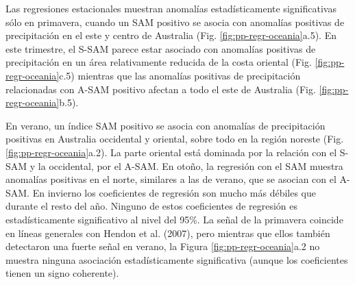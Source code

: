 \documentclass[12pt,oneside]{reedthesis}
\begin{document}
Las regresiones estacionales muestran anomalías estadísticamente significativas sólo en primavera, cuando un SAM positivo se asocia con anomalías positivas de precipitación en el este y centro de Australia (Fig. \ref{fig:pp-regr-oceania}a.5).
En este trimestre, el S-SAM parece estar asociado con anomalías positivas de precipitación en un área relativamente reducida de la costa oriental (Fig. \ref{fig:pp-regr-oceania}c.5) mientras que las anomalías positivas de precipitación relacionadas con A-SAM positivo afectan a todo el este de Australia (Fig. \ref{fig:pp-regr-oceania}b.5).

En verano, un índice SAM positivo se asocia con anomalías de precipitación positivas en Australia occidental y oriental, sobre todo en la región noreste (Fig. \ref{fig:pp-regr-oceania}a.2).
La parte oriental está dominada por la relación con el S-SAM y la occidental, por el A-SAM.
En otoño, la regresión con el SAM muestra anomalías positivas en el norte, similares a las de verano, que se asocian con el A-SAM.
En invierno los coeficientes de regresión son mucho más débiles que durante el resto del año.
Ninguno de estos coeficientes de regresión es estadísticamente significativo al nivel del 95\%.
La señal de la primavera coincide en líneas generales con Hendon et al. (2007), pero mientras que ellos también detectaron una fuerte señal en verano, la Figura \ref{fig:pp-regr-oceania}a.2 no muestra ninguna asociación estadísticamente significativa (aunque los coeficientes tienen un signo coherente).
\end{document}
